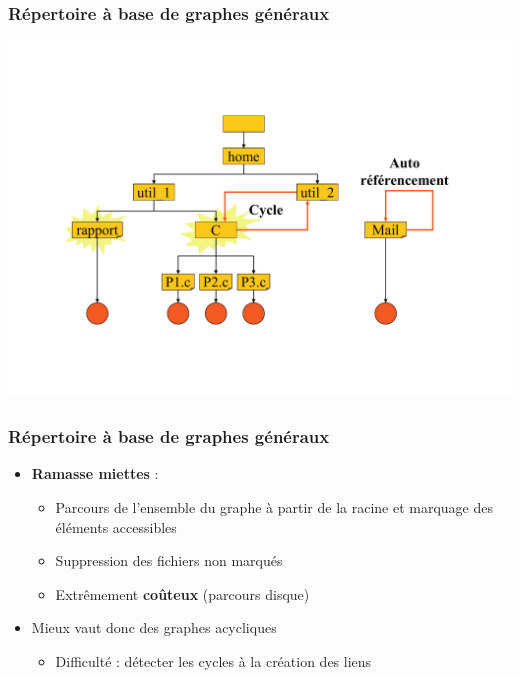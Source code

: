 \begin{frame}
\frametitle{Répertoire à base de graphes généraux}
\includegraphics[width=.9\textwidth]{../illustration/repertoire_graphe_g.pdf}
\end{frame}

\begin{frame}
\frametitle{Répertoire à base de graphes généraux}
\begin{itemize}
\item \textbf{Ramasse miettes} :
\begin{itemize}
\item Parcours de l'ensemble du graphe à partir de la racine et marquage des éléments accessibles
\item Suppression des fichiers non marqués
\item Extrêmement \textbf{coûteux} (parcours disque)
\end{itemize}
\item Mieux vaut donc des graphes acycliques
\begin{itemize}
\item Difficulté : détecter les cycles à la création des liens
\end{itemize}
\end{itemize}
\end{frame}

